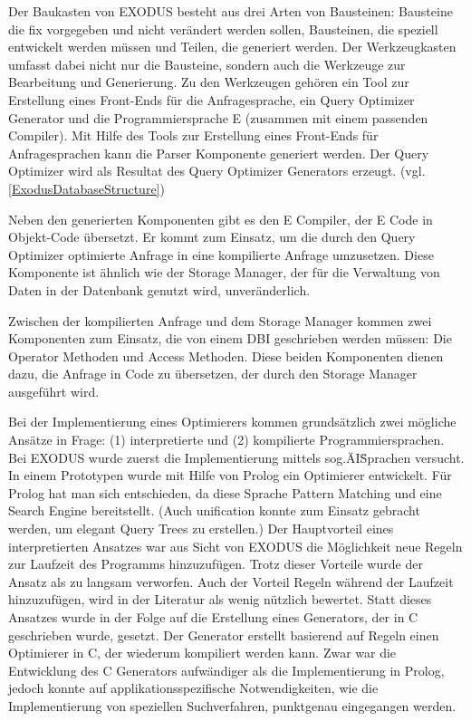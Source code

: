 Der Baukasten von EXODUS besteht aus drei Arten von Bausteinen: Bausteine die fix vorgegeben und nicht verändert werden sollen, Bausteinen, die speziell entwickelt werden müssen und Teilen, die generiert werden. Der Werkzeugkasten umfasst dabei nicht nur die Bausteine, sondern auch die Werkzeuge zur Bearbeitung und Generierung. Zu den Werkzeugen gehören ein Tool zur Erstellung eines Front-Ends für die Anfragesprache, ein Query Optimizer Generator und die Programmiersprache E (zusammen mit einem passenden Compiler). Mit Hilfe des Tools zur Erstellung eines Front-Ends für Anfragesprachen kann die Parser Komponente generiert werden. Der Query Optimizer wird als Resultat des Query Optimizer Generators erzeugt. (vgl. \ref{ExodusDatabaseStructure})

Neben den generierten Komponenten gibt es den E Compiler, der E Code in Objekt-Code übersetzt. Er kommt zum Einsatz, um die durch den Query Optimizer optimierte Anfrage in eine kompilierte Anfrage umzusetzen. Diese Komponente ist ähnlich wie der Storage Manager, der für die Verwaltung von Daten in der Datenbank genutzt wird, unveränderlich. 

Zwischen der kompilierten Anfrage und dem Storage Manager kommen zwei Komponenten zum Einsatz, die von einem DBI geschrieben werden müssen: Die Operator Methoden und Access Methoden. Diese beiden Komponenten dienen dazu, die Anfrage in Code zu übersetzen, der durch den  Storage Manager ausgeführt wird.

Bei der Implementierung eines Optimierers kommen grundsätzlich zwei mögliche Ansätze in Frage: (1) interpretierte und (2) kompilierte Programmiersprachen. Bei EXODUS wurde zuerst die Implementierung mittels sog.\"AI\" Sprachen versucht. In einem Prototypen wurde mit Hilfe von Prolog ein Optimierer entwickelt. Für Prolog hat man sich entschieden, da diese Sprache Pattern Matching und eine Search Engine bereitstellt. (Auch unification konnte zum Einsatz gebracht werden, um elegant Query Trees zu erstellen.) Der Hauptvorteil eines interpretierten Ansatzes war aus Sicht von EXODUS die Möglichkeit neue Regeln zur Laufzeit des Programms hinzuzufügen. Trotz dieser Vorteile wurde der Ansatz als zu langsam verworfen. Auch der Vorteil Regeln während der Laufzeit hinzuzufügen, wird in der Literatur  als wenig nützlich bewertet. Statt dieses Ansatzes wurde in der Folge auf die Erstellung eines Generators, der in C geschrieben wurde, gesetzt. Der Generator erstellt basierend auf Regeln einen Optimierer in C, der wiederum kompiliert werden kann. Zwar war die Entwicklung des C Generators aufwändiger als die Implementierung in Prolog, jedoch konnte auf applikationsspezifische Notwendigkeiten, wie die Implementierung von speziellen Suchverfahren, punktgenau eingegangen werden.


